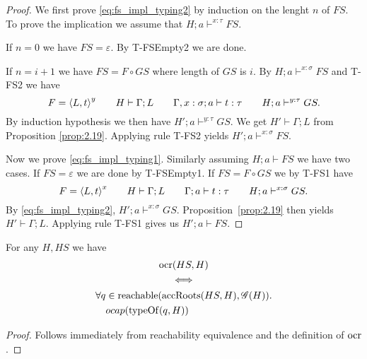 \begin{proof}
  We first prove \eqref{eq:fs_impl_typing2} by induction on the lenght $n$ of
  $FS$. To prove the implication we assume that $H; a \vdash^{x: \tau} FS$.
  
  If $n = 0$ we have $FS = \varepsilon$. By {\sc T-FSEmpty2} we are done.
  
  If $n = i + 1$ we have $FS = F \circ GS$ where length of $GS$ is $i$. By  
  $H; a \vdash^{x: \sigma} FS$ and {\sc T-FS2} we have 
  \begin{equation*}
    F = \mbox{$\langle L, t \rangle$}^{y} \quad\quad H \vdash \Gamma; L \quad\quad \mbox{$\Gamma, x:
    \sigma;a\vdash t:\tau$} \quad\quad H; a \vdash^{y: \tau} GS.
  \end{equation*}
  By induction hypothesis we then have $H'; a \vdash^{y: \tau} GS$. We get $H'
  \vdash \Gamma; L$ from Proposition \ref{prop:2.19}. Applying rule {\sc T-FS2}
  yields $H'; a \vdash^{x: \sigma} FS$.

  Now we prove \eqref{eq:fs_impl_typing1}. Similarly assuming $H; a \vdash FS$
  we have two cases. If $FS = \varepsilon$ we are done by {\sc T-FSEmpty1}. If
  $FS = F \circ GS$ we by {\sc T-FS1} have
  \begin{equation*}
    F = \mbox{$\langle L, t \rangle$}^{x} \quad\quad H \vdash \Gamma; L \quad\quad
    \mbox{$\Gamma;a\vdash t:\tau$} \quad\quad H; a \vdash^{x: \sigma} GS.
  \end{equation*}
  By \eqref{eq:fs_impl_typing2}, $H'; a \vdash^{x: \sigma} GS$. 
  Proposition~\ref{prop:2.19} then yields $H' \vdash \Gamma; L$. Applying rule {\sc
  T-FS1} gives us $H'; a \vdash FS$.
\end{proof}

\begin{proposition} \label{prop:ocrloc_eq}
  For any $H, HS$ we have
  \begin{equation*}
    \begin{gathered}
      \mbox{$\mathrm{ocr}$}(HS, H) \\
      \iff  \\
      \begin{aligned}
        \forall q &\in \mbox{$\mathrm{reachable}$}(\mbox{$\mathrm{accRoots}$}(HS, H), \mathscr{G}(H)). \\
        & \mbox{$ocap$}(\mbox{$\mathrm{typeOf}$}(q, H))
      \end{aligned}
    \end{gathered}
  \end{equation*}
\end{proposition}
\begin{proof}
  Follows immediately from reachability equivalence and the definition of
  $\mbox{$\mathrm{ocr}$}$.
\end{proof}


